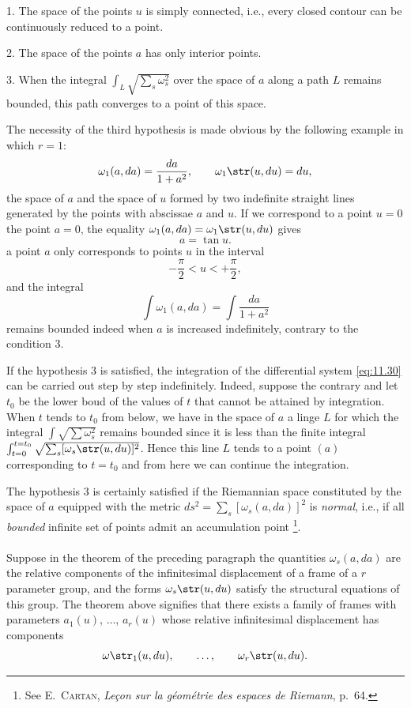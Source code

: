\somespace

1. The space of the points $u$ is simply connected, i.e., every closed contour can be continuously reduced to a point.

2. The space of the points $a$ has only interior points.

3. When the integral $\int_{L}\sqrt{\sum_{s}\omega_{s}^{2}}$ over the space of $a$ along a path $L$ remains bounded, this path converges to a point of this space.

\somespace

The necessity of the third hypothesis is made obvious by the following example in which $r=1$:
\[
\omega_{1}(a,da)=\frac{da}{1+a^{2}},\qquad\omega_{1}\str(u,du)=du,
\]
the space of $a$ and the space of $u$ formed by two indefinite straight lines generated by the points with abscissae $a$ and $u$. If we correspond to a point $u=0$ the point $a=0$, the equality $\omega_{1}(a,da)=\omega_{1}\str(u,du)$ gives
\[
a=\tan u.
\]
a point $a$ only corresponds to points $u$ in the interval
\[
-\frac{\pi}{2}<u<+\frac{\pi}{2},
\]
and the integral
\[
\int \omega_{1}(a,da)=\int\frac{da}{1+a^{2}}
\]
remains bounded indeed when $a$ is increased indefinitely, contrary to the condition 3.

If the hypothesis 3 is satisfied, the integration of the differential system \eqref{eq:11.30} can be carried out step by step indefinitely. Indeed, suppose the contrary and let $t_{0}$ be the lower boud of the values of $t$ that cannot be attained by integration. When $t$ tends to $t_{0}$ from below, we have in the space of $a$ a linge $L$ for which the integral $\int\sqrt{\sum\omega_{s}^{2}}$ remains bounded since it is less than the finite integral $\int_{t=0}^{t=t_{0}}\sqrt{\sum_{s}[\omega_{s}\str(u,du)]^{2}}$. Hence this line $L$ tends to a point $(a)$ corresponding to $t=t_{0}$ and from here we can continue the integration.

The hypothesis 3 is certainly satisfied if the Riemannian space constituted by the space of $a$ equipped with the metric $ds^{2}=\sum_{s}[\omega_{s}(a,da)]^{2}$ is \emph{normal}, i.e., if all \emph{bounded} infinite set of points admit an accumulation point \footnote{See \textsc{E.~Cartan}, \emph{Leçon sur la géométrie des espaces de Riemann}, p.~64.}.


\paragraph{}
\label{sec:163}
Suppose in the theorem of the preceding paragraph the quantities $\omega_{s}(a,da)$ are the relative components of the infinitesimal displacement of a frame of a $r$ parameter group, and the forms $\omega_{s}\str(u,du)$ satisfy the structural equations of this group. The theorem above signifies that there exists a family of frames with parameters $a_{1}(u)$, $\dots$, $a_{r}(u)$ whose relative infinitesimal displacement has components
\[
\omega\str_{1}(u,du),\qquad\dots,\qquad\omega_{r}\str(u,du).
\]

